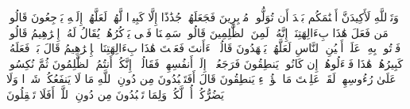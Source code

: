 \stopbuffer%
\startbuffer[\q:21:57]
وَتَٱللَّهِ لَأَكِیدَنَّ أَصۡنَٰمَكُم بَعۡدَ أَن تُوَلُّوا۟ مُدۡبِرِینَ%
\stopbuffer%
\startbuffer[\q:21:58]
فَجَعَلَهُمۡ جُذَٰذًا إِلَّا كَبِیرࣰا لَّهُمۡ لَعَلَّهُمۡ إِلَیۡهِ یَرۡجِعُونَ%
\stopbuffer%
\startbuffer[\q:21:59]
قَالُوا۟ مَن فَعَلَ هَٰذَا بِءَالِهَتِنَاۤ إِنَّهُۥ لَمِنَ ٱلظَّٰلِمِینَ%
\stopbuffer%
\startbuffer[\q:21:60]
قَالُوا۟ سَمِعۡنَا فَتࣰى یَذۡكُرُهُمۡ یُقَالُ لَهُۥۤ إِبۡرَٰهِیمُ%
\stopbuffer%
\startbuffer[\q:21:61]
قَالُوا۟ فَأۡتُوا۟ بِهِۦ عَلَىٰۤ أَعۡیُنِ ٱلنَّاسِ لَعَلَّهُمۡ یَشۡهَدُونَ%
\stopbuffer%
\startbuffer[\q:21:62]
قَالُوۤا۟ ءَأَنتَ فَعَلۡتَ هَٰذَا بِءَالِهَتِنَا یَٰۤإِبۡرَٰهِیمُ%
\stopbuffer%
\startbuffer[\q:21:63]
قَالَ بَلۡ فَعَلَهُۥ كَبِیرُهُمۡ هَٰذَا فَسۡءَلُوهُمۡ إِن كَانُوا۟ یَنطِقُونَ%
\stopbuffer%
\startbuffer[\q:21:64]
فَرَجَعُوۤا۟ إِلَىٰۤ أَنفُسِهِمۡ فَقَالُوۤا۟ إِنَّكُمۡ أَنتُمُ ٱلظَّٰلِمُونَ%
\stopbuffer%
\startbuffer[\q:21:65]
ثُمَّ نُكِسُوا۟ عَلَىٰ رُءُوسِهِمۡ لَقَدۡ عَلِمۡتَ مَا هَٰۤؤُلَاۤءِ یَنطِقُونَ%
\stopbuffer%
\startbuffer[\q:21:66]
قَالَ أَفَتَعۡبُدُونَ مِن دُونِ ٱللَّهِ مَا لَا یَنفَعُكُمۡ شَیۡءࣰا وَلَا یَضُرُّكُمۡ%
\stopbuffer%
\startbuffer[\q:21:67]
أُفࣲّ لَّكُمۡ وَلِمَا تَعۡبُدُونَ مِن دُونِ ٱللَّهِۚ أَفَلَا تَعۡقِلُونَ%
\stopbuffer%
